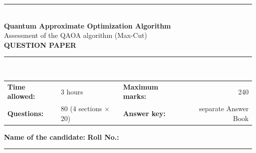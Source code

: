 \documentclass[11pt,a4paper]{article}
\begin{document}
\pagestyle{fancy}\fancyhf{}
\renewcommand{\headrulewidth}{0.4pt}

\thispagestyle{empty}
\begin{center}
{\color{brand}\rule{\linewidth}{1.2pt}}\\[6pt]
{\Huge\bfseries\color{brand} Quantum Approximate Optimization Algorithm}\\[4pt]
{\Large Assessment of the QAOA algorithm (Max-Cut)}\\[4pt]
{\large\bfseries QUESTION PAPER}\\[2pt]
{\color{brand}\rule{\linewidth}{1.2pt}}\\[1pt]
\end{center}
\vspace{-2pt}
\begin{tabularx}{\linewidth}{@{}lXlr@{}}
\textbf{Time allowed:} & 3 hours & \textbf{Maximum marks:} & 240\\
\textbf{Questions:} & 80 (4 sections $\times$ 20) & \textbf{Answer key:} & separate Answer Book
\end{tabularx}
\vspace{6pt}

\textbf{Name of the candidate:} \hrulefill\quad \textbf{Roll No.:} \rule{35mm}{0.4pt}
\end{document}
